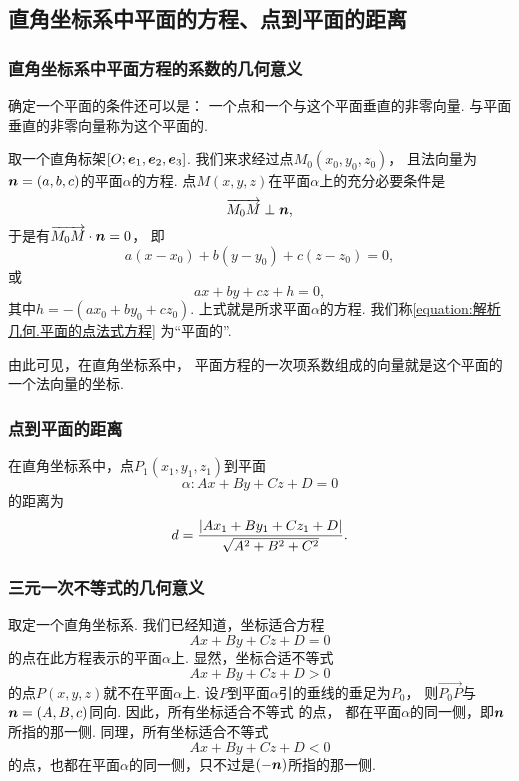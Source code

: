 \subsection{直角坐标系中平面的方程、点到平面的距离}

\subsubsection{直角坐标系中平面方程的系数的几何意义}
确定一个平面的条件还可以是：
一个点和一个与这个平面垂直的非零向量.
与平面垂直的非零向量称为这个平面的.

取一个直角标架\([O;\boldsymbol{e}_1,\boldsymbol{e}_2,\boldsymbol{e}_3]\).
我们来求经过点\(M_0(x_0,y_0,z_0)\)，
且法向量为\(\boldsymbol{n}=(a,b,c)\)的平面\(\alpha\)的方程.
点\(M(x,y,z)\)在平面\(\alpha\)上的充分必要条件是\[
	\overrightarrow{M_0 M} \perp \boldsymbol{n},
\]
于是有\(\overrightarrow{M_0 M} \cdot \boldsymbol{n} = 0\)，
即\begin{equation}\label{equation:解析几何.平面的点法式方程}
	a(x-x_0) + b(y-y_0) + c(z-z_0) = 0,
\end{equation}
或\[
	a x + b y + c z + h = 0,
\]其中\(h=-(a x_0 + b y_0 + c z_0)\).
上式就是所求平面\(\alpha\)的方程.
我们称\cref{equation:解析几何.平面的点法式方程} 为“平面的”.

由此可见，在直角坐标系中，
平面方程的一次项系数组成的向量就是这个平面的一个法向量的坐标.

\subsubsection{点到平面的距离}
\begin{theorem}
在直角坐标系中，点\(P_1(x_1,y_1,z_1)\)到平面\[
	\alpha: A x + B y + C z + D = 0
\]的距离为
\begin{equation}
	d = \frac{\abs{A x_1 + B y_1 + C z_1 + D}}{\sqrt{A^2 + B^2 + C^2}}.
\end{equation}
\end{theorem}

\subsubsection{三元一次不等式的几何意义}
取定一个直角坐标系.
我们已经知道，坐标适合方程\[
	A x + B y + C z + D = 0
\]的点在此方程表示的平面\(\alpha\)上.
显然，坐标合适不等式
\begin{equation}\label{equation:解析几何.平面的侧1}
	A x + B y + C z + D > 0
\end{equation}
的点\(P(x,y,z)\)就不在平面\(\alpha\)上.
设\(P\)到平面\(\alpha\)引的垂线的垂足为\(P_0\)，
则\(\vec{P_0 P}\)与\(\boldsymbol{n}=(A,B,c)\)同向.
因此，所有坐标适合不等式  的点，
都在平面\(\alpha\)的同一侧，即\(\boldsymbol{n}\)所指的那一侧.
同理，所有坐标适合不等式
\begin{equation}\label{equation:解析几何.平面的侧2}
	A x + B y + C z + D < 0
\end{equation}
的点，也都在平面\(\alpha\)的同一侧，只不过是\((-\boldsymbol{n})\)所指的那一侧.

